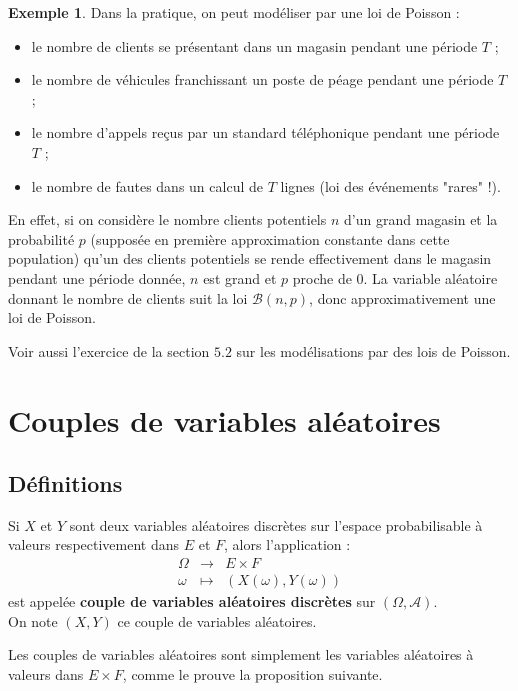 \documentclass[french]{article}
\theoremstyle{plain}
\theoremstyle{definition}
\newtheorem*{ex}{Exemple}
\theoremstyle{remark}
\begin{document}
\begin{ex}
	Dans la pratique, on peut modéliser par une loi de Poisson :
	\begin{itemize}
		\item le nombre de clients se présentant dans un magasin pendant une période $T$ ;
		\item le nombre de véhicules franchissant un poste de péage pendant une période $T$ ;
		\item le nombre d'appels reçus par un standard téléphonique pendant une période $T$ ;
		\item le nombre de fautes dans un calcul de $T$ lignes (loi des événements "rares" !).
	\end{itemize}
	En effet, si on considère le nombre clients potentiels $n$ d'un grand magasin et la probabilité $p$ (supposée en première approximation constante dans cette population) qu'un des clients potentiels se rende effectivement dans le magasin pendant une période donnée, $n$ est grand et $p$ proche de $0$. La variable aléatoire donnant le nombre de clients suit la loi $\mathcal{B}(n,p)$, donc approximativement une loi de Poisson.
\end{ex}

Voir aussi l'exercice de la section $5.2$ sur les modélisations par des lois de Poisson.

\section{Couples de variables aléatoires}

\subsection{Définitions}

\begin{dfn}
	Si $X$ et $Y$ sont deux variables aléatoires discrètes sur l'espace probabilisable à valeurs respectivement dans $E$ et $F$, alors l'application : $$\begin{array}{rcl}
		\Omega&\longrightarrow&E\times F\\
		\omega&\longmapsto&(X(\omega),Y(\omega))
	\end{array}$$ est appelée \textbf{couple de variables aléatoires discrètes} sur $(\Omega,\mathcal{A})$.\\
	On note $(X,Y)$ ce couple de variables aléatoires.
\end{dfn}

Les couples de variables aléatoires sont simplement les variables aléatoires à valeurs dans $E\times F$, comme le prouve la proposition suivante.
\end{document}
